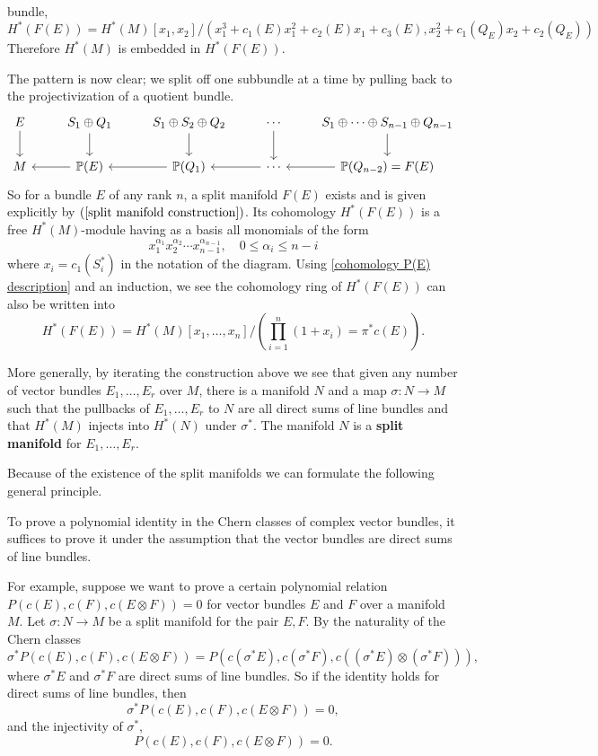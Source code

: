 bundle,
\[H^*(F(E))=H^*(M)[x_1,x_2]/(x_1^3+c_1(E)x_1^2+c_2(E)x_1+c_3(E),x_2^2+c_1(Q_E)x_2+c_2(Q_E))\]
Therefore $H^*(M)$ is embedded in $H^*(F(E))$.\par
The pattern is now clear; we split off one subbundle at a time by pulling back to the projectivization of a quotient bundle.
\begin{equation}\label{split manifold construction}
\begin{tikzcd}
E\ar[d]&S_1\oplus Q_1\ar[d]&S_1\oplus S_{2}\oplus Q_{2}\ar[d]&\cdots\ar[d]&S_1\oplus\cdots\oplus S_{n-1}\oplus Q_{n-1}\ar[d]\\
M&\mathbb{P}(E)\ar[l]&\mathbb{P}(Q_1)\ar[l]&\cdots\ar[l]&\mathbb{P}(Q_{n-2})=F(E)\ar[l]
\end{tikzcd}
\end{equation}
So for a bundle $E$ of any rank $n$, a split manifold $F(E)$ exists and is given explicitly by $(\ref{split manifold construction})$. Its cohomology $H^*(F(E))$ is a 
free $H^*(M)$-module having as a basis all monomials of the form
\[x_1^{\alpha_1}x_2^{\alpha_2}\cdots x_{n-1}^{\alpha_{n-1}},\quad 0\leq\alpha_i\leq n-i\]
where $x_i=c_1(S_i^*)$ in the notation of the diagram. Using \cref{cohomology P(E) description} and an induction, we see the cohomology ring of 
$H^*(F(E))$ can also be written into
\[H^*(F(E))=H^*(M)[x_1,\dots,x_n]/(\prod_{i=1}^{n}(1+x_i)=\pi^*c(E)).\]

More generally, by iterating the construction above we see that given any number of vector bundles $E_1,\dots,E_r$ over $M$, there is a manifold $N$ and a map $\sigma:N\to M$ 
such that the pullbacks of $E_1,\dots,E_r$ to $N$ are all direct sums of line bundles and that $H^*(M)$ injects into $H^*(N)$ under $\sigma^*$. The manifold $N$ is a 
\textbf{split manifold} for $E_1,\dots,E_r$.\par
Because of the existence of the split manifolds we can formulate the following general principle.
\begin{proposition}
To prove a polynomial identity in the Chern classes of complex vector bundles, it suffices to prove it under the assumption that the vector bundles are direct sums of 
line bundles.
\end{proposition}
For example, suppose we want to prove a certain polynomial relation $P(c(E),c(F),c(E\otimes F))=0$ for vector bundles $E$ and $F$ over a manifold $M$. Let $\sigma:N\to M$ 
be a split manifold for the pair $E,F$. By the naturality of the Chern classes
\[\sigma^*P(c(E),c(F),c(E\otimes F))=P(c(\sigma^*E),c(\sigma^*F),c((\sigma^*E)\otimes(\sigma^*F))),\]
where $\sigma^*E$ and $\sigma^*F$ are direct sums of line bundles. So if the identity holds for direct sums of line bundles, then
\[\sigma^*P(c(E),c(F),c(E\otimes F))=0,\]
and the injectivity of $\sigma^*$,
\[P(c(E),c(F),c(E\otimes F))=0.\]
